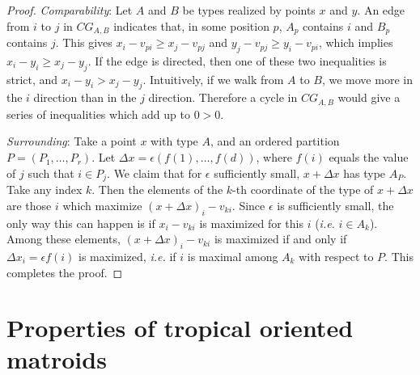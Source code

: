 \documentclass[11pt]{amsart}
\begin{document}
\begin{proof}
\textit{Comparability}:
Let $A$ and $B$ be types realized by points $x$ and $y$. An edge from $i$ 
to $j$ in $CG_{A,B}$ indicates that, in some position $p$, $A_p$ contains 
$i$ and $B_p$ contains $j$. This gives $x_i - v_{pi} \geq x_j-v_{pj}$ and $y_j-v_{pj} \geq y_i - v_{pi}$, which implies $x_i - y_i \geq x_j - y_j$. If the edge is directed, then one of these two inequalities is strict, and $x_i - y_i > x_j - y_j$. Intuitively, if we walk from $A$ to $B$, we move more in the $i$ direction than in the $j$ direction. Therefore a cycle in $CG_{A,B}$ would give a series of inequalities which add up to $0 > 0$. 
%

\textit{Surrounding}: Take a point $x$ with type $A$, and an ordered partition $P=(P_1, \ldots, P_r)$. Let $\Delta x = \epsilon (f(1), \ldots, 
f(d))$, where $f(i)$ equals the value of $j$ such that $i\in P_j$. We claim that for $\epsilon$ sufficiently small, $x + \Delta x $ has type $A_P$. Take any 
index $k$. Then the elements of the $k$-th coordinate of the type of $x + \Delta x$ are those $i$ which maximize $(x+\Delta x)_i - v_{ki}$. Since 
$\epsilon$ is sufficiently small, the only way this can happen is if $x_i - v_{ki}$ is maximized for this $i$ (\emph{i.e.} $i\in A_k$). Among these 
elements, $(x+ \Delta x)_i - v_{ki}$ is maximized if and only if $\Delta x_i = \epsilon f(i)$ is maximized, \emph{i.e.} if $i$ is maximal among $A_k$ with 
respect to $P$. This completes the proof.
\end{proof}


\section{Properties of tropical oriented matroids}\label{sec:properties}
\end{document}

